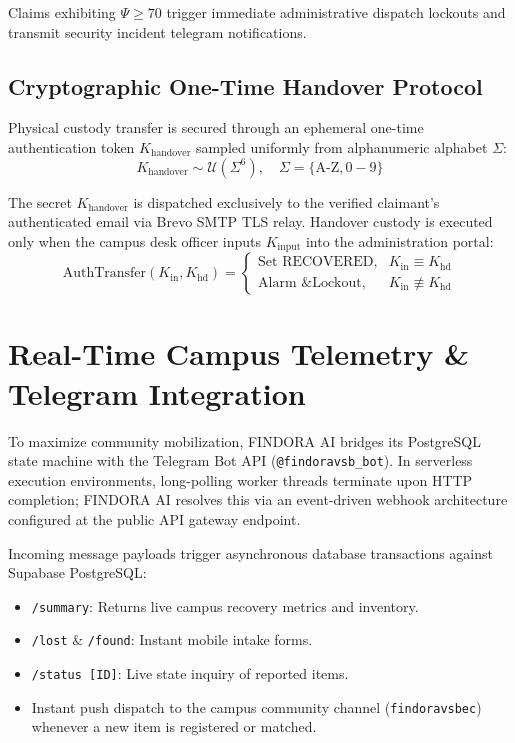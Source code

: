 \documentclass[conference]{IEEEtran}
\begin{document}
Claims exhibiting $\Psi \ge 70$ trigger immediate administrative dispatch lockouts and transmit security incident telegram notifications.

\subsection{Cryptographic One-Time Handover Protocol}
Physical custody transfer is secured through an ephemeral one-time authentication token $K_{\text{handover}}$ sampled uniformly from alphanumeric alphabet $\Sigma$:
\begin{equation}
    K_{\text{handover}} \sim \mathcal{U}\left(\Sigma^6\right), \quad \Sigma = \{\text{A-Z}, 0-9\}
\end{equation}

The secret $K_{\text{handover}}$ is dispatched exclusively to the verified claimant's authenticated email via Brevo SMTP TLS relay. Handover custody is executed only when the campus desk officer inputs $K_{\text{input}}$ into the administration portal:
\begin{equation}
    \text{AuthTransfer}(K_{\text{in}}, K_{\text{hd}}) = \begin{cases}
        \text{Set RECOVERED}, & K_{\text{in}} \equiv K_{\text{hd}} \\
        \text{Alarm \& Lockout}, & K_{\text{in}} \not\equiv K_{\text{hd}}
    \end{cases}
\end{equation}

\section{Real-Time Campus Telemetry \& Telegram Integration}

To maximize community mobilization, FINDORA AI bridges its PostgreSQL state machine with the Telegram Bot API (\texttt{@findoravsb\_bot}). In serverless execution environments, long-polling worker threads terminate upon HTTP completion; FINDORA AI resolves this via an event-driven webhook architecture configured at the public API gateway endpoint.

Incoming message payloads trigger asynchronous database transactions against Supabase PostgreSQL:
\begin{itemize}
    \item \texttt{/summary}: Returns live campus recovery metrics and inventory.
    \item \texttt{/lost} \& \texttt{/found}: Instant mobile intake forms.
    \item \texttt{/status [ID]}: Live state inquiry of reported items.
    \item Instant push dispatch to the campus community channel (\texttt{findoravsbec}) whenever a new item is registered or matched.
\end{itemize}
\end{document}
